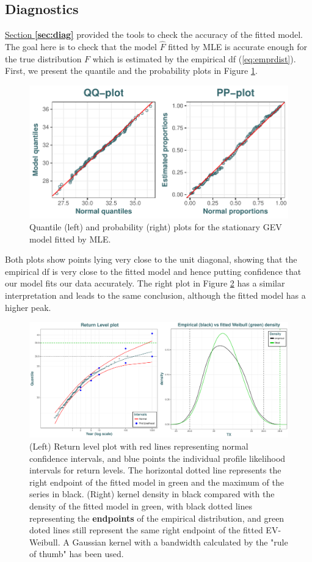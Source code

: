 \subsection{Diagnostics}

\hyperref[sec:diag]{Section \textbf{\ref{sec:diag}}} provided the tools to check the accuracy of the fitted model. The goal here is to check that the
model $\hat{F}$ fitted by MLE is accurate enough for the true distribution $F$ which is estimated by the empirical df
(\ref{eq:emprdist}). First, we present the quantile and the probability plots in Figure \ref{fig:ppqqplot}.

\begin{figure}[!htb]
	\centering	\includegraphics[width=.7\linewidth]{pp_qqplot.pdf}\caption{Quantile (left) and probability (right) plots for the stationary GEV model fitted by MLE.}\label{fig:ppqqplot}
\end{figure}

Both plots show points lying very close to the unit diagonal, showing that the empirical df is very close to the fitted model and hence putting confidence that our model fits our data accurately.
The right plot in Figure \ref{fig:rl_empdes} has a similar interpretation and leads to the same conclusion, although the fitted model has a higher peak.

\begin{figure}[!htb]
	\centering	\includegraphics[width=.75\linewidth]{rl_empdes.pdf}\caption{(Left) Return level plot with red lines representing normal confidence intervals, and blue points the individual profile likelihood intervals for return levels. The horizontal dotted line represents the right endpoint of the	fitted model in green and the maximum of the series in black. (Right) kernel density in black compared with the density of the fitted model in green, with black dotted lines representing the \textbf{endpoints} of the empirical distribution, and green doted lines still represent the same right endpoint of the fitted EV-Weibull. A Gaussian kernel with a bandwidth calculated by the \citet[pp.48, (3.31)]{silverman_1986} "rule of thumb" has been used.}\label{fig:rl_empdes}
\end{figure}


